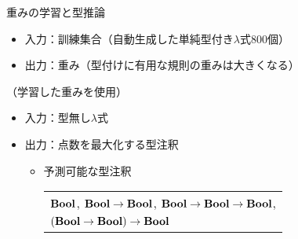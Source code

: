 \begin{block}{重みの学習と型推論}
  \begin{itemize}
  \item 入力：訓練集合（自動生成した単純型付き$\lambda$式800個）
  \item 出力：重み（型付けに有用な規則の重みは大きくなる）
  \end{itemize}
  （学習した重みを使用）
  \begin{itemize}
  \item 入力：型無し$\lambda$式
  \item 出力：点数を最大化する型注釈
    \begin{itemize}
    \item 予測可能な型注釈\\
      \begin{tabular}[t]{l}
        $\mathbf{Bool}$,\quad
        $\mathbf{Bool}\to\mathbf{Bool}$,\quad
        $\mathbf{Bool}\to\mathbf{Bool}\to\mathbf{Bool}$, \\
        $(\mathbf{Bool}\to\mathbf{Bool})\to\mathbf{Bool}$
      \end{tabular}
    \end{itemize}
  \end{itemize}
\end{block}
